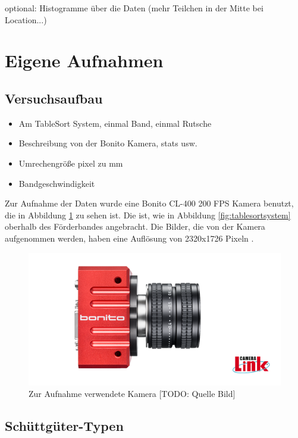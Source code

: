 optional: Histogramme über die Daten (mehr Teilchen in der Mitte bei Location...)



\section{Eigene Aufnahmen}

\subsection{Versuchsaufbau}

\begin{itemize}
	\item Am TableSort System, einmal Band, einmal Rutsche
	\item Beschreibung von der Bonito Kamera, stats usw.
	\item Umrechengröße pixel zu mm
	\item Bandgeschwindigkeit
\end{itemize}

\color{blue}
Zur Aufnahme der Daten wurde eine Bonito CL-400 200 FPS Kamera benutzt, die in Abbildung \ref{pictureCam} zu sehen ist.
Die ist, wie in Abbildung \ref{fig:tablesortsystem} oberhalb des Förderbandes angebracht.
Die Bilder, die von der Kamera aufgenommen werden, haben eine Auflösung von 2320x1726 Pixeln \cite{alliedvisiontechnologiesgmbh2014}.

\begin{figure}
    \centering
    \includegraphics[width=\textwidth]{img/banner-Bonito_cropped}
    \caption{Zur Aufnahme verwendete Kamera [TODO: Quelle Bild]}
    \label{pictureCam}
\end{figure}

\subsection{Schüttgüter-Typen}

